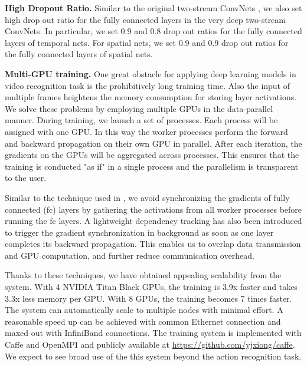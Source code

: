 \documentclass[10pt,twocolumn,letterpaper]{article}
\begin{document}
\textbf{High Dropout Ratio.} Similar to the original two-stream ConvNets \cite{SimonyanZ14}, we also set high drop out ratio for the fully connected layers in the very deep two-stream ConvNets. In particular, we set 0.9 and 0.8 drop out ratios for the fully connected layers of temporal nets. For spatial nets, we set 0.9 and 0.9 drop out ratios for the fully connected layers of spatial nets.

\textbf{Multi-GPU training.}  One great obstacle for applying deep learning models in video recognition task is the prohibitively long training time. Also the input of multiple frames heightens the memory consumption for storing layer activations. We solve these problems by employing multiple GPUs in the data-parallel manner. 
During training, we launch a set of processes. Each process will be assigned with one GPU. In this way the worker processes perform the forward and backward propagation on their own GPU in parallel. After each iteration, the gradients on the GPUs will be aggregated across processes. This ensures that the training is conducted "as if" in a single process and the parallelism is transparent to the user.

Similar to the technique used in \cite{HeArxiv2015}, we avoid synchronizing the gradients of fully connected (fc) layers by gathering the activations from all worker processes before running the fc layers. 
A lightweight dependency tracking has also been introduced to trigger the gradient synchronization in background as soon as one layer completes its backward propagation.
This enables us to overlap data transmission and GPU computation, and further reduce communication overhead.

Thanks to these techniques, we have obtained appealing scalability from the system. With 4 NVIDIA Titan Black GPUs, the training is 3.9x faster and takes 3.3x less memory per GPU. With 8 GPUs, the training becomes 7 times faster. The system can automatically scale to multiple nodes with minimal effort. A reasonable speed up can be achieved with common Ethernet connection and maxed out with InfiniBand connections. The training system is implemented with Caffe and OpenMPI and publicly available at \url{https://github.com/yjxiong/caffe}. We expect to see broad use of the this system beyond the action recognition task.
\end{document}
